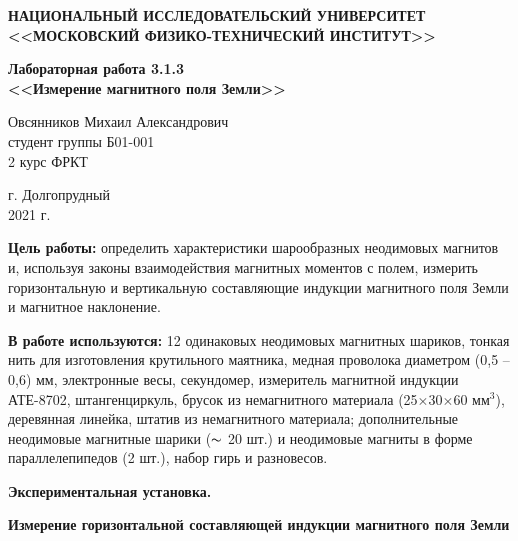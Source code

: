 \documentclass[a4paper,12pt]{article} %
\begin{document}
	\begin{center}
		
		\textbf{НАЦИОНАЛЬНЫЙ ИССЛЕДОВАТЕЛЬСКИЙ УНИВЕРСИТЕТ \\ <<МОСКОВСКИЙ ФИЗИКО-ТЕХНИЧЕСКИЙ ИНСТИТУТ>>}
		\vspace{13ex}
		
		\textbf{Лабораторная работа 3.1.3 \\ <<Измерение магнитного поля Земли>> }
		\vspace{60ex}
		
		\normalsize{Овсянников Михаил Александрович \\ студент группы Б01-001\\ 2 курс ФРКТ\\}
	\end{center}
	
	\vfill 
	
	\begin{center}
		г. Долгопрудный\\ 
		2021 г.
	\end{center}
	
	\thispagestyle{empty} %
	
	\newpage
	\setcounter{page}{20}
	
\textbf{Цель работы:} определить характеристики шарообразных неодимовых магнитов и, используя законы взаимодействия магнитных моментов с полем, измерить горизонтальную и вертикальную составляющие индукции магнитного поля Земли и магнитное наклонение.

\textbf{В работе используются:} 12 одинаковых неодимовых магнитных шариков, тонкая нить для изготовления крутильного маятника, медная проволока диаметром (0,5 – 0,6) мм, электронные весы, секундомер, измеритель магнитной индукции АТЕ-8702, штангенциркуль, брусок из немагнитного материала (25$\times$30$\times$60 мм$^3$), деревянная линейка, штатив из немагнитного материала; дополнительные неодимовые магнитные шарики ($\thicksim$ 20 шт.) и неодимовые магниты в форме параллелепипедов (2 шт.), набор гирь и разновесов.

\vspace{7mm}
{\large \textbf{Экспериментальная установка.}}

\textbf{Измерение горизонтальной составляющей индукции магнитного поля Земли}
\end{document}
